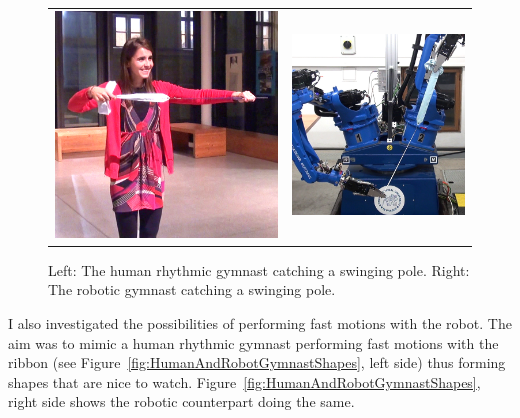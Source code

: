         \begin{figure}[h]
            \centering
            \begin{tabular}{cc}
            \includegraphics[height=0.39\textwidth]{Img/ribbon/HumanGymnastPendulum.png}
            &
            \includegraphics[height=0.39\textwidth]{Img/ribbon/PoleCaught.png}
            \end{tabular}
            \caption{Left: The human rhythmic gymnast catching a swinging pole. Right: The robotic gymnast catching a swinging pole.}
            \label{fig:HumanAndRobotGymnastPoleCatch}
        \end{figure}

        I also investigated the possibilities of performing fast motions with the \CloPeMa\/ robot. The aim was to mimic a human rhythmic gymnast performing fast motions with the ribbon (see Figure~\ref{fig:HumanAndRobotGymnastShapes}, left side) thus forming shapes that are nice to watch. Figure~\ref{fig:HumanAndRobotGymnastShapes}, right side shows the robotic counterpart doing the same.

